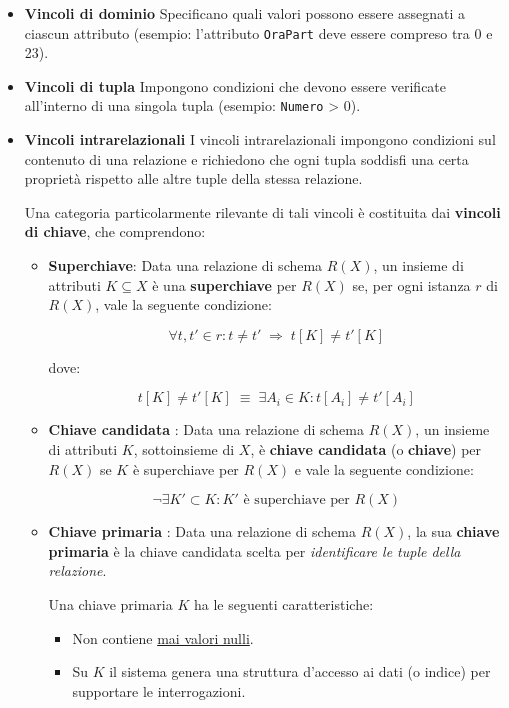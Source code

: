 \begin{itemize}
    \item \textbf{Vincoli di dominio}  
    Specificano quali valori possono essere assegnati a ciascun attributo 
    (esempio: l’attributo \texttt{OraPart} deve essere compreso tra 0 e 23).

    \item \textbf{Vincoli di tupla}  
    Impongono condizioni che devono essere verificate all'interno di una 
    singola tupla (esempio: \texttt{Numero} > 0).

    \item \textbf{Vincoli intrarelazionali}  
I vincoli intrarelazionali impongono condizioni sul contenuto di una
relazione e richiedono che ogni tupla soddisfi una certa proprietà
rispetto alle altre tuple della stessa relazione.

Una categoria particolarmente rilevante di tali vincoli è costituita
dai \textbf{vincoli di chiave}, che comprendono:
\begin{itemize}
    \item \textbf{Superchiave}: Data una relazione di schema $R(X)$, un insieme di attributi $K \subseteq X$
è una \textbf{superchiave} per $R(X)$ se, per ogni istanza $r$ di $R(X)$,
vale la seguente condizione:

\[
\forall t, t' \in r : t \neq t' \;\Rightarrow\; t[K] \neq t'[K]
\]

dove:

\[
t[K] \neq t'[K] \;\equiv\; \exists A_i \in K : t[A_i] \neq t'[A_i]
\]

    \item \textbf{Chiave candidata} : Data una relazione di schema $R(X)$, un insieme di attributi $K$, 
sottoinsieme di $X$, è \textbf{chiave candidata} (o \textbf{chiave}) per $R(X)$
se $K$ è superchiave per $R(X)$ e vale la seguente condizione:

\[
\neg \exists K' \subset K : K' \text{ è superchiave per } R(X)
\]
    \item \textbf{Chiave primaria} : Data una relazione di schema $R(X)$, la sua \textbf{chiave primaria}
è la chiave candidata scelta per \textit{identificare le tuple della relazione}.

Una chiave primaria $K$ ha le seguenti caratteristiche:

\begin{itemize}
    \item Non contiene \underline{mai valori nulli}.
    \item Su $K$ il sistema genera una struttura d’accesso ai dati (o indice)
          per supportare le interrogazioni.
\end{itemize}
\begin{tcolorbox}[colback=yellow!20, colframe=yellow!50!black, title={Kristian semplifica così – Le tre chiavi spiegate intuitivamente}]


\end{tcolorbox}
\end{itemize}
\end{itemize}
